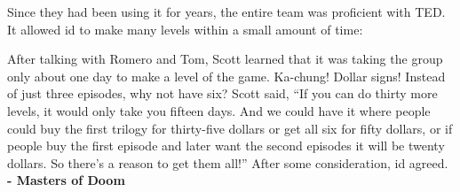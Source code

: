 \documentclass[book.tex]{subfiles}
\begin{document}
Since they had been using it for years, the entire team was proficient with TED. It allowed id to make many levels within a small amount of time:

 \begin{fancyquotes}
After talking with Romero and Tom, Scott learned that it was taking the group only about one day to make a level of the game. Ka-chung! Dollar signs! Instead of just three episodes, why not have six? Scott said, “If you can do thirty more levels, it would only take you fifteen days. And we could have it where people could buy the first trilogy for thirty-five dollars or get all six for fifty dollars, or if people buy the first episode and later want the second episodes it will be twenty dollars. So there’s a reason to get them all!” After some consideration, id agreed.
 \textbf{- Masters of Doom}
 \end{fancyquotes}\\
\end{document}
